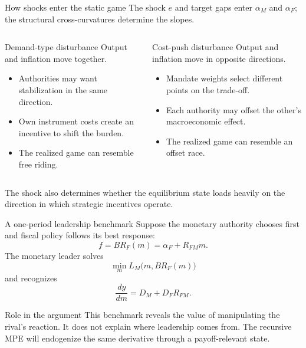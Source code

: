 \documentclass[10pt,aspectratio=169]{beamer}
\begin{document}
\begin{frame}{How shocks enter the static game}
The shock $e$ and target gaps enter $\alpha_M$ and $\alpha_F$; the structural
cross-curvatures determine the slopes.
\begin{columns}[T,onlytextwidth]
\begin{block}{Demand-type disturbance}
Output and inflation move together.
\begin{itemize}
  \item Authorities may want stabilization in the same direction.
  \item Own instrument costs create an incentive to shift the burden.
  \item The realized game can resemble free riding.
\end{itemize}
\end{block}
\begin{alertblock}{Cost-push disturbance}
Output and inflation move in opposite directions.
\begin{itemize}
  \item Mandate weights select different points on the trade-off.
  \item Each authority may offset the other's macroeconomic effect.
  \item The realized game can resemble an offset race.
\end{itemize}
\end{alertblock}
\end{columns}
\vfill
The shock also determines whether the equilibrium state loads heavily on the
direction in which strategic incentives operate.
\end{frame}

\begin{frame}{A one-period leadership benchmark}
Suppose the monetary authority chooses first and fiscal policy follows its best
response:
\begin{equation*}
f=BR_F(m)=\alpha_F+R_{FM}m.
\end{equation*}
The monetary leader solves
\begin{equation*}
\min_m L_M\bigl(m,BR_F(m)\bigr)
\end{equation*}
and recognizes
\begin{equation*}
\frac{dy}{dm}=D_M+D_FR_{FM}.
\end{equation*}
\begin{alertblock}{Role in the argument}
This benchmark reveals the value of manipulating the rival's reaction. It does
not explain where leadership comes from. The recursive MPE will endogenize the
same derivative through a payoff-relevant state.
\end{alertblock}
\end{frame}
\end{document}
